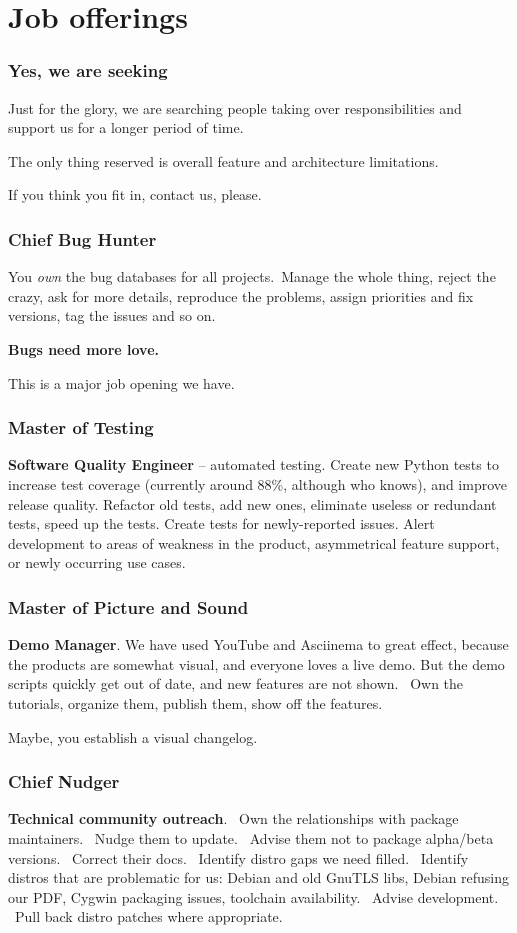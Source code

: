 \documentclass[t,handout]{beamer}
\begin{document}
\section{Job offerings}

\begin{frame}[fragile]\frametitle{Yes, we are seeking}
    \vfill
    Just for the glory, we are searching people taking over responsibilities and support us for a longer period of time.

    The only thing reserved is overall feature and architecture limitations.

    If you think you fit in, contact us, please.
\end{frame}

\begin{frame}[fragile]\frametitle{Chief Bug Hunter}
    \vfill
    You \textit{own} the bug databases for all projects. Manage the whole thing, reject the crazy, ask for more details, reproduce the problems, assign priorities and fix versions, tag the issues and so on.

    \textbf{Bugs need more love.}

    This is a major job opening we have.
\end{frame}

\begin{frame}[fragile]\frametitle{Master of Testing}
    \vfill
    \textbf{Software Quality Engineer} -- automated testing. Create new Python tests to increase test coverage (currently around 88\%, although who knows), and improve release quality. Refactor old tests, add new ones, eliminate useless or redundant tests, speed up the tests. Create tests for newly-reported issues. Alert development to areas of weakness in the product, asymmetrical feature support, or newly occurring use cases.
\end{frame}

\begin{frame}[fragile]\frametitle{Master of Picture and Sound}
    \vfill
    \textbf{Demo Manager}. We have used YouTube and Asciinema to great effect, because the products are somewhat visual, and everyone loves a live demo. But the demo scripts quickly get out of date, and new features are not shown.  Own the tutorials, organize them, publish them, show off the features.

    Maybe, you establish a visual changelog.
\end{frame}

\begin{frame}[fragile]\frametitle{Chief Nudger}
    \vfill
    \textbf{Technical community outreach}.  Own the relationships with package maintainers.  Nudge them to update.  Advise them not to package alpha/beta versions.  Correct their docs.  Identify distro gaps we need filled.  Identify distros that are problematic for us: Debian and old GnuTLS libs, Debian refusing our PDF, Cygwin packaging issues, toolchain availability.  Advise development.  Pull back distro patches where appropriate.
\end{frame}
\end{document}
